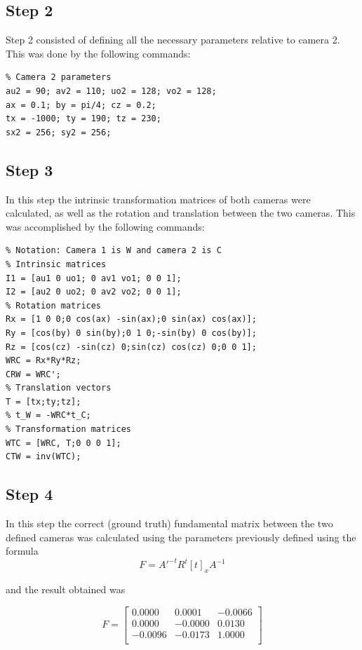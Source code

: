 \documentclass[peerreview,11pt]{IEEEtran}
\begin{document}
\subsection{Step 2}

Step 2 consisted of defining all the necessary parameters relative to camera 2. This was done by the following commands:


\begin{verbatim}
% Camera 2 parameters
au2 = 90; av2 = 110; uo2 = 128; vo2 = 128;
ax = 0.1; by = pi/4; cz = 0.2;
tx = -1000; ty = 190; tz = 230;
sx2 = 256; sy2 = 256;
\end{verbatim}


\subsection{Step 3}

In this step the intrinsic transformation matrices of both cameras were calculated, as well as the rotation and translation between the two cameras. This was accomplished by the following commands:

\begin{verbatim}
% Notation: Camera 1 is W and camera 2 is C
% Intrinsic matrices
I1 = [au1 0 uo1; 0 av1 vo1; 0 0 1];
I2 = [au2 0 uo2; 0 av2 vo2; 0 0 1];
% Rotation matrices
Rx = [1 0 0;0 cos(ax) -sin(ax);0 sin(ax) cos(ax)];
Ry = [cos(by) 0 sin(by);0 1 0;-sin(by) 0 cos(by)];
Rz = [cos(cz) -sin(cz) 0;sin(cz) cos(cz) 0;0 0 1];
WRC = Rx*Ry*Rz;
CRW = WRC';
% Translation vectors
T = [tx;ty;tz];
% t_W = -WRC*t_C;
% Transformation matrices
WTC = [WRC, T;0 0 0 1];
CTW = inv(WTC);
\end{verbatim}

\subsection{Step 4}

In this step the correct (ground truth) fundamental matrix between the two defined cameras was calculated using the parameters previously defined using the formula $$F = A'^{-t}R^t [t]_x A^{-1}$$

and the result obtained was 

\[
F = 
\begin{bmatrix}
    0.0000  &  0.0001  & -0.0066\\
    0.0000  & -0.0000  &  0.0130\\
   -0.0096  & -0.0173  &  1.0000\\
\end{bmatrix}
\]
\end{document}
